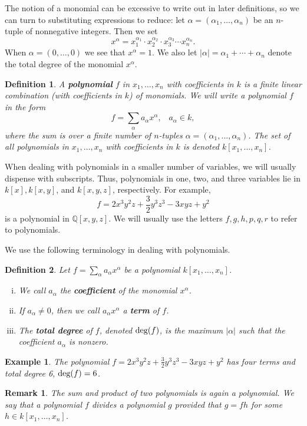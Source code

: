 \documentclass[12pt,reqno]{amsart}
\theoremstyle{plain}
\newtheorem{defi}{Definition}
\newtheorem{rem}{Remark}
\newcommand{\degg}{\textup{deg}}
\newtheorem{ex}{Example}
\newcommand{\qq}{\mathbb Q}
\newcommand{\gap}{\; \; \;}
\begin{document}
The notion of a monomial can be excessive to write out in later definitions, so we can turn to substituting expressions to reduce: let $\alpha = (\alpha_1, \ldots, \alpha_n )$ be an $n$-tuple of nonnegative integers. Then we set $$x^{\alpha} = x_1^{\alpha_1} \cdot x_2^{\alpha_2} \cdot x_3^{\alpha_3} \cdots x_n^{\alpha_n}.$$
When $\alpha = (0, \ldots, 0)$ we see that $x^{\alpha} = 1$. We also let $|\alpha| = \alpha_1 + \cdots + \alpha_n$ denote the total degree of the monomial $x^{\alpha}$.

\begin{defi} A \textup{\textbf{polynomial}} $f$ in $x_1, \ldots, x_n$ with coefficients in $k$ is a finite linear combination (with coefficients in $k$) of monomials. We will write a polynomial $f$ in the form $$f = \sum_{\alpha} a_{\alpha} x^{\alpha}, \gap a_{\alpha} \in k, $$ where the sum is over a finite number of $n$-tuples $\alpha = (\alpha_1, \ldots, \alpha_n )$. The set of all polynomials in $x_1, \ldots , x_n$ with coefficients in $k$ is denoted $k \left[x_1, \ldots , x_n\right]$.
\end{defi}

When dealing with polynomials in a smaller number of variables, we will usually dispense with subscripts. Thus, polynomials in one, two, and three variables lie in $k[x], k[x,y]$, and $k[x,y,z]$, respectively. For example, $$f = 2x^3 y^2 z + \frac{3}{2} y^3 z^3 - 3xyz + y^2$$ is a polynomial in $\qq [x,y,z]$. We will usually use the letters $f, g, h, p, q, r$ to refer to polynomials. 

We use the following terminology in dealing with polynomials.


\begin{defi} Let $f = \sum_{\alpha} a_{\alpha} x^{\alpha}$ be a polynomial $k \left[x_1, \ldots , x_n\right]$.
\begin{enumerate}[(i)]
\item We call $a_\alpha$ the \textup{\textbf{coefficient}} of the monomial $x^{\alpha}$.
\item If $a_\alpha \neq 0$, then we call $a_{\alpha} x^{\alpha}$ a \textup{\textbf{term}} of $f$.
\item The \textup{\textbf{total degree}} of $f$, denoted $\degg (f)$, is the maximum $| \alpha|$ such that the coefficient $a_{\alpha}$ is nonzero. 
\end{enumerate}
\end{defi}
\begin{ex} The polynomial $f= 2x^3 y^2 z + \frac{3}{2} y^3 z^3 - 3xyz +y^2$ has four terms and total degree 6, $\degg (f) = 6$. 
\end{ex}
\begin{rem} The sum and product of two polynomials is again a polynomial. We say that a polynomial $f$ \textit{divides} a polynomial $g$ provided that $g = fh$ for some $h \in k [x_1, \ldots , x_n ]$.
\end{rem}
\end{document}
